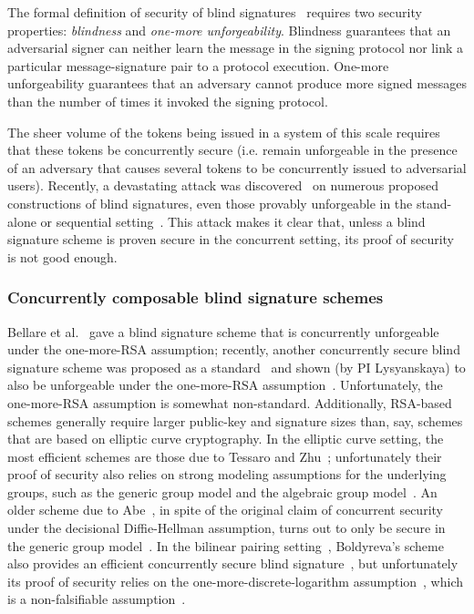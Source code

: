 The formal definition of security of blind signatures~\cite{JC:PoiSte00,C:JueLubOst97,RSA:AbdNamNev06,JC:SchUnr17} requires two security properties: \emph{blindness} and \emph{one-more unforgeability}. Blindness guarantees that an adversarial signer can neither learn the message in the signing protocol nor link a particular message-signature pair to a protocol execution.  One-more unforgeability guarantees that an adversary cannot produce more signed messages than the number of times it invoked the signing protocol.  

The sheer volume of the tokens being issued in a system of this scale requires that these tokens be concurrently secure (i.e. remain unforgeable in the presence of an adversary that causes several tokens to be concurrently issued to adversarial users). Recently, a devastating attack was discovered~\cite{EC:BLLOR21} on numerous proposed constructions of blind signatures, even those provably unforgeable in the stand-alone or sequential setting~\cite{C:Okamoto92,ICICS:Schnorr01,C:AbeOka00,C:Brands93,paquin2013u-prove,CCS:BalLys13,SP:STVWJG16,cryptoeprint:2017:682,JC:GJKR07}.  This attack makes it clear that, unless a blind signature scheme is proven secure in the concurrent setting, its proof of security is not good enough.

\subsubsection{Concurrently composable blind signature schemes}  
\label{rg1:blindsigs}

Bellare et al.~\cite{JC:BNPS03} gave a blind signature scheme that is concurrently unforgeable under the one-more-RSA assumption; recently, another concurrently secure blind signature scheme was proposed as a standard~\cite{ietf:djw21,ietf:djw22} and shown (by PI Lysyanskaya) to also be unforgeable under the one-more-RSA assumption~\cite{EPRINT:Lysyanskaya22}.  Unfortunately, the one-more-RSA assumption is somewhat non-standard.  Additionally, RSA-based schemes generally require larger public-key and signature sizes than, say, schemes that are based on elliptic curve cryptography.  In the elliptic curve setting, the most efficient schemes are those due to Tessaro and Zhu~\cite{EC:TesZhu22}; unfortunately their proof of security also relies on strong modeling assumptions for the underlying groups, such as the generic group model and the algebraic group model~\cite{C:FucKilLos18,EC:Shoup97}.  An older scheme due to Abe~\cite{EC:Abe01}, in spite of the original claim of concurrent security under the decisional Diffie-Hellman assumption, turns out to only be secure in the generic group model~\cite{PKC:KLRX22}.  In the bilinear pairing setting~\cite{C:BonFra01}, Boldyreva's scheme also provides an efficient concurrently secure blind signature~\cite{PKC:Boldyreva03}, but unfortunately its proof of security relies on the one-more-discrete-logarithm assumption~\cite{C:BelPal02}, which is a non-falsifiable assumption~\cite{C:Naor03}.  

